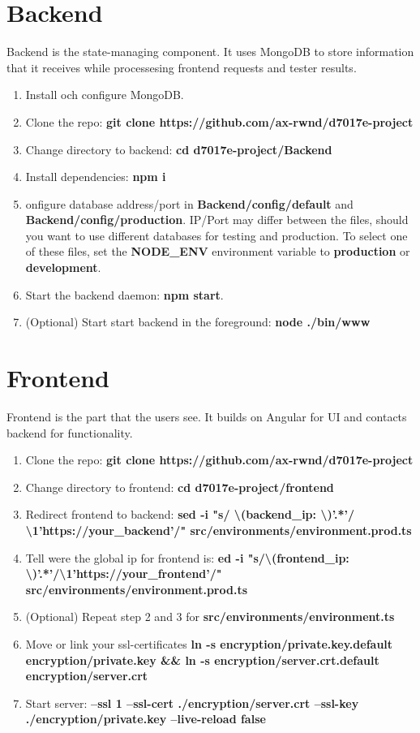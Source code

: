 \section{Backend}
Backend is the state-managing component. It uses MongoDB to store information that it receives while processesing frontend requests and tester results.
\begin{enumerate}
\item Install och configure MongoDB.
\item Clone the repo: \textbf{git clone https://github.com/ax-rwnd/d7017e-project}
\item Change directory to backend: \textbf{cd d7017e-project/Backend}
\item Install dependencies: \textbf{npm i}
\item onfigure database address/port in \textbf{Backend/config/default} and \textbf{Backend/config/production}. IP/Port may differ between the files, should you want to use different databases for testing and production. To select one of these files, set the \textbf{NODE\_ENV} environment variable to \textbf{production} or \textbf{development}.
\item Start the backend daemon: \textbf{npm start}.
\item (Optional) Start start backend in the foreground: \textbf{node ./bin/www}
\end{enumerate}

\section{Frontend}
Frontend is the part that the users see. It builds on Angular for UI and contacts backend for functionality.

\begin{enumerate}
    \item Clone the repo: \textbf{git clone https://github.com/ax-rwnd/d7017e-project}
    \item Change directory to frontend: \textbf{cd d7017e-project/frontend}
    \item Redirect frontend to backend: \textbf{sed -i "s/ \textbackslash (backend\_ip: \textbackslash )'.*'/ \\ \textbackslash 1'https://{your\_backend}'/" src/environments/environment.prod.ts}
    \item Tell were the global ip for frontend is: \textbf{ed -i "s/\textbackslash (frontend\_ip: \\ \textbackslash)'.*'/\textbackslash 1'https://{your\_frontend}'/" src/environments/environment.prod.ts}
    \item (Optional) Repeat step 2 and 3 for \textbf{src/environments/environment.ts}
    \item Move or link your ssl-certificates \textbf{ln -s encryption/private.key.default encryption/private.key \&\& ln -s encryption/server.crt.default encryption/server.crt}
    \item Start server: \textbf{--ssl 1 --ssl-cert ./encryption/server.crt --ssl-key ./encryption/private.key --live-reload false}
\end{enumerate}

